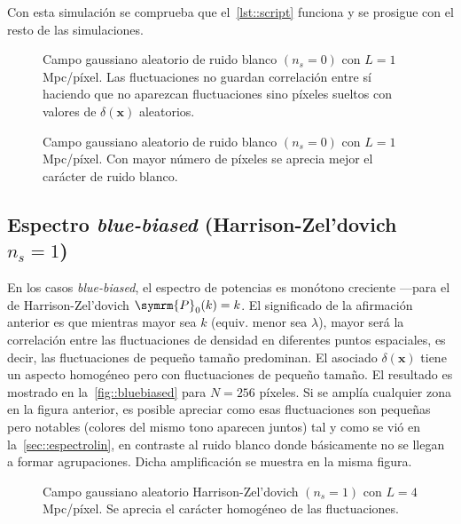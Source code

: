 Con esta simulación se comprueba que el~\autoref{lst::script} funciona y se prosigue con el resto de las simulaciones.
\begin{figure}[h!]
    \centering
    {}
    \caption[Ruido blanco \(N=32\) píxeles y \(L=1\) Mpc/píxel]{Campo gaussiano aleatorio de ruido blanco \((n_s=0)\) con \(L=1\) Mpc/píxel. Las fluctuaciones no guardan correlación entre sí haciendo que no aparezcan fluctuaciones sino píxeles sueltos con valores de \(\delta(\symbf{x})\) aleatorios.}
    \label{fig::ruidoblanco32}
\end{figure}
\begin{figure}[t!]
    \centering
    {}
    \caption[Ruido blanco \(N=256\) píxeles y \(L=1\) Mpc/píxel]{Campo gaussiano aleatorio de ruido blanco \((n_s=0)\) con \(L=1\) Mpc/píxel. Con mayor número de píxeles se aprecia mejor el carácter de ruido blanco.}
    \label{fig::ruidoblanco128}
\end{figure}
\newpage
\subsection{Espectro \textit{blue-biased} (Harrison-Zel'dovich \texorpdfstring{\(n_s=1\)}{ns=1})}
En los casos \textit{blue-biased}, el espectro de potencias es monótono creciente ---para el de Harrison-Zel'dovich \(\symrm{P}_0(k)=k\). El significado de la afirmación anterior es que mientras mayor sea \(k\) (equiv. menor sea \(\lambda\)), mayor será la correlación entre las fluctuaciones de densidad en diferentes puntos espaciales, es decir, las fluctuaciones de pequeño tamaño predominan. El asociado \(\delta(\symbf{x})\) tiene un aspecto homogéneo pero con fluctuaciones de pequeño tamaño. El resultado es mostrado en la~\autoref{fig::bluebiased} para \(N=256\) píxeles.
Si se amplía cualquier zona en la figura anterior, es posible apreciar como esas fluctuaciones son pequeñas pero notables (colores del mismo tono aparecen juntos) tal y como se vió en la~\autoref{sec::espectrolin}, en contraste al ruido blanco donde básicamente no se llegan a formar agrupaciones. Dicha amplificación se muestra en la misma figura.
\begin{figure}
    \centering
    \def\svgwidth{.94\textwidth}
    
    \caption[Harrison-Zel'dovich \(N=256\) píxeles y \(L=4\) Mpc/píxel]{Campo gaussiano aleatorio Harrison-Zel'dovich \((n_s=1)\) con \(L=4\) Mpc/píxel. Se aprecia el carácter homogéneo de las fluctuaciones.}
    \label{fig::bluebiased}
\end{figure}
\newpage
